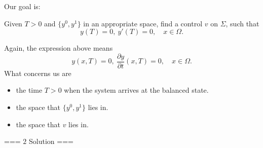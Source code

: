 Our goal is:
\begin{problem}
    Given $T>0$ and $\{y^0,y^1\}$ in an appropriate space, 
    find a control $v$ on $\Sigma$, such that
    \[y(T)=0,\ y'(T)=0,\quad x\in\Omega.\]
\end{problem}
Again, the expression above means
\[y(x,T)=0, \ \frac{\partial y}{\partial t}(x,T)=0,\quad x\in\Omega.\]
What concerns us are
\begin{itemize}
    \item the time $T>0$ when the system arrives at the balanced state.
    \item the space that $\{y^0,y^1\}$ lies in.
    \item the space that $v$ lies in.
\end{itemize}

=== $\boxed{2}$ Solution ===

